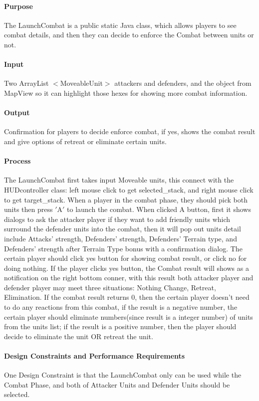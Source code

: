 \documentclass[12pt,a4paper,titlepage]{article}
\begin{document}
\paragraph{Purpose} The LaunchCombat is a public static Java class, which allows players to see combat details, and then they can decide to enforce the Combat between units or not.
\paragraph{Input} Two ArrayList $<$MoveableUnit$>$ attackers and defenders, and the object from MapView so it can highlight those hexes for showing more combat information.
\paragraph{Output} Confirmation for players to decide enforce combat, if yes, shows the combat result and give options of retreat or eliminate certain units.
\paragraph{Process} The LaunchCombat first takes input Moveable units, this connect with the HUDcontroller class: left mouse click to get selected\_stack, and right mouse click to get target\_stack. When a player in the combat phase, they should pick both units then press $'$A$'$ to launch the combat. When clicked A button, first it shows dialogs to ask the attacker player if they want to add friendly units which surround the defender units into the combat, then it will pop out units detail include Attacks' strength, Defenders' strength, Defenders' Terrain type, and Defenders' strength after Terrain Type bonus with a confirmation dialog. The certain player should click yes button for showing combat result, or click no for doing nothing. If the player clicks yes button, the Combat result will shows as a notification on the right bottom conner, with this result both attacker player and defender player may meet three situations: Nothing Change, Retreat, Elimination. If the combat result returns 0, then the certain player doesn't need to do any reactions from this combat, if the result is a negative number, the certain player should eliminate numbers(since result is a integer number) of units from the units list; if the result is a positive number, then the player should decide to eliminate the unit OR retreat the unit.
\paragraph{Design Constraints and Performance Requirements} 
One Design Constraint is that the LaunchCombat only can be used while the Combat Phase, and both of Attacker Units and Defender Units should be selected. 
\end{document}
